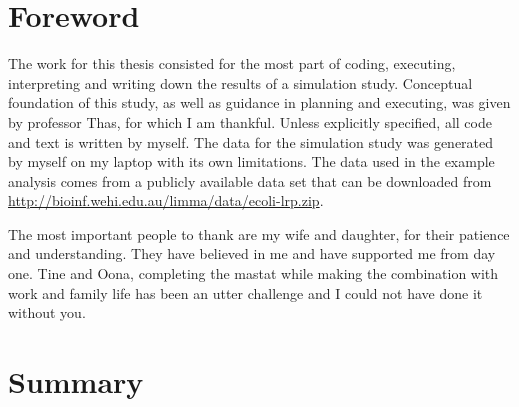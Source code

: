 \documentclass[
]{article}
\author{}
\date{\vspace{-2.5em}}
\begin{document}
{
\setcounter{tocdepth}{2}
\tableofcontents
}
\onehalfspacing

\thispagestyle{empty}

\clearpage

\setcounter{page}{0}

\newpage

\thispagestyle{empty}

\hypertarget{foreword}{%
\section*{Foreword}\label{foreword}}

The work for this thesis consisted for the most part of coding, executing, interpreting and writing down the results of a simulation study. Conceptual foundation of this study, as well as guidance in planning and executing, was given by professor Thas, for which I am thankful. Unless explicitly specified, all code and text is written by myself. The data for the simulation study was generated by myself on my laptop with its own limitations. The data used in the example analysis comes from a publicly available data set that can be downloaded from \url{http://bioinf.wehi.edu.au/limma/data/ecoli-lrp.zip}.

The most important people to thank are my wife and daughter, for their patience and understanding. They have believed in me and have supported me from day one. Tine and Oona, completing the mastat while making the combination with work and family life has been an utter challenge and I could not have done it without you.

\newpage

\clearpage

\setcounter{page}{1}

\hypertarget{summary}{%
\section*{Summary}\label{summary}}
\end{document}

